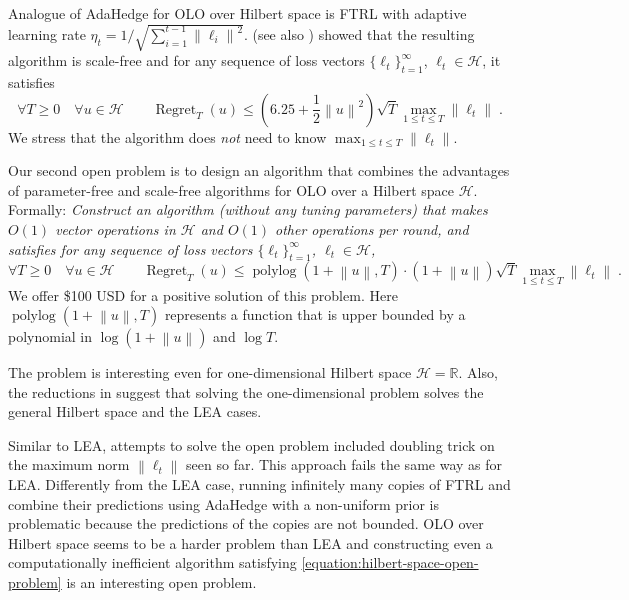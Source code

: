 \documentclass{colt2016} %
\DeclareMathOperator{\Regret}{Regret}
\DeclareMathOperator{\polylog}{polylog}
\newcommand{\R}{\mathbb{R}}     %
\renewcommand{\H}{\mathcal{H}}  %
\newcommand{\norm}[1]{\left\|{#1}\right\|}
\begin{document}
Analogue of AdaHedge for OLO over Hilbert space is FTRL with adaptive learning
rate $\eta_t = 1/\sqrt{\sum_{i=1}^{t-1} \norm{\ell_i}^2}$.
\cite{Orabona-Pal-2015} (see also \cite{Orabona-Pal-2016-scale-free}) showed
that the resulting algorithm is scale-free and for any sequence of loss vectors
$\{\ell_t\}_{t=1}^\infty$, $\ell_t \in \H$, it satisfies
$$
\forall T \ge 0 \quad \forall u \in \H \qquad \Regret_T(u) \le \left(6.25 + \frac{1}{2}\norm{u}^2 \right) \sqrt{T} \max_{1 \le t \le T} \norm{\ell_t} \; .
$$
We stress that the algorithm does \emph{not} need to know $\max_{1 \le t \le T}
\norm{\ell_t}$.

Our second open problem is to design an algorithm that combines the advantages
of parameter-free and scale-free algorithms for OLO over a Hilbert space $\H$.
Formally: \emph{Construct an algorithm (without any tuning parameters) that
makes $O(1)$ vector operations in $\H$ and $O(1)$ other operations per round,
and satisfies for any sequence of loss vectors $\{\ell_t\}_{t=1}^\infty$,
$\ell_t \in \H$,}
\begin{equation}
\label{equation:hilbert-space-open-problem}
\forall T \ge 0 \quad \forall u \in \H \qquad
\Regret_T(u) \le \polylog(1 + \norm{u}, T) \cdot (1 + \norm{u}) \sqrt{T} \max_{1 \le t \le T} \norm{\ell_t} \; .
\end{equation}
We offer \$100 USD for a positive solution of this problem.  Here $\polylog(1 +
\norm{u}, T)$ represents a function that is upper bounded by a polynomial in
$\log(1+\norm{u})$ and $\log T$.

The problem is interesting even for one-dimensional Hilbert space $\H = \R$.
Also, the reductions in \cite{Orabona-Pal-2016-parameter-free} suggest that
solving the one-dimensional problem solves the general Hilbert space and the
LEA cases.

Similar to LEA, attempts to solve the open problem included doubling trick on
the maximum norm $\norm{\ell_t}$ seen so far. This approach fails the same way
as for LEA. Differently from the LEA case, running infinitely many copies of
FTRL and combine their predictions using AdaHedge with a non-uniform prior is
problematic because the predictions of the copies are not bounded. OLO over
Hilbert space seems to be a harder problem than LEA and constructing even a
computationally inefficient algorithm satisfying
\eqref{equation:hilbert-space-open-problem} is an interesting open problem.


\end{document}

